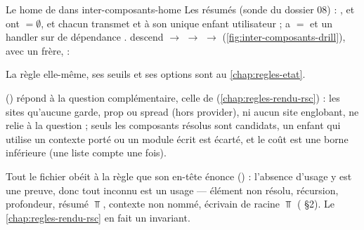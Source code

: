 \begin{exemple}{Le home de  dans }{inter-composants-home}
Les résumés (sonde du dossier 08) : ,  et  ont
 $= \emptyset$, et chacun transmet  et  à son unique
enfant utilisateur ;  a  $=$ 
et un handler  sur  de dépendance .
 descend  $\to$  $\to$  $\to$
 (\cref{fig:inter-composants-drill}), avec un frère,  :
La règle elle-même, ses seuils et ses options sont au \cref{chap:regles-etat}.
\end{exemple}

 () répond à la
question complémentaire, celle de  (\cref{chap:regles-rendu-rsc}) :
les sites qu'aucune garde, prop ou spread (hors provider), ni aucun site englobant, ne relie à la
question ; seuls les composants résolus sont candidats, un enfant qui utilise un contexte porté
ou un module écrit est écarté, et le coût est une borne inférieure (une liste compte une fois).

\begin{remarque}
Tout le fichier  obéit à la règle que son en-tête énonce
() : l'absence d'usage y est une preuve, donc tout
inconnu est un usage --- élément non résolu, récursion, profondeur, résumé $\Top$, contexte non
nommé, écrivain de racine $\Top$ ( §2). Le \cref{chap:regles-rendu-rsc} en fait un
invariant.
\end{remarque}

